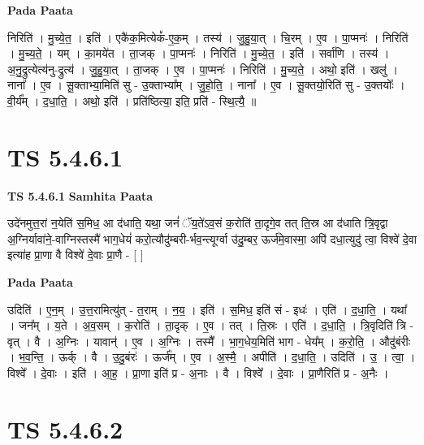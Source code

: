 \documentclass[17pt]{extarticle}
\begin{document}
\textbf{Pada Paata} \newline

निरिति॑ । मु॒च्ये॒त॒ । इति॑ । एकै॑क॒मित्येकं᳚-ए॒क॒म् । तस्य॑ । जु॒हु॒या॒त् । चि॒रम् । ए॒व । पा॒प्मनः॑ । निरिति॑ । मु॒च्य॒ते॒ । यम् । का॒मये॑त । ता॒जक् । पा॒प्मनः॑ । निरिति॑ । मु॒च्ये॒त॒ । इति॑ । सर्वा॑णि । तस्य॑ । अ॒नु॒द्रुत्येत्य॑नु-द्रुत्य॑ । जु॒हु॒या॒त् । ता॒जक् । ए॒व । पा॒प्मनः॑ । निरिति॑ । मु॒च्य॒ते॒ । अथो॒ इति॑ । खलु॑ । नाना᳚ । ए॒व । सू॒क्ताभ्या॒मिति॑ सु - उ॒क्ताभ्या᳚म् । जु॒हो॒ति॒ । नाना᳚ । ए॒व । सू॒क्तयो॒रिति॑ सु - उ॒क्तयोः᳚ । वी॒र्य᳚म् । द॒धा॒ति॒ । अथो॒ इति॑ । प्रति॑ष्ठित्या॒ इति॒ प्रति॑ - स्थि॒त्यै॒ ॥  \newline





\section{ TS 5.4.6.1 }

\textbf{TS 5.4.6.1 } \newline
\textbf{Samhita Paata} \newline

उदे॑नमुत्त॒रां न॒येति॑ स॒मिध॒ आ द॑धाति॒ यथा॒ जनं॑ ॅय॒ते॑ऽव॒सं क॒रोति॑ ता॒दृगे॒व तत् ति॒स्र आ द॑धाति त्रि॒वृद्वा अ॒ग्निर्यावा॑ने॒-वाग्निस्तस्मै॑ भाग॒धेयं॑ करो॒त्यौदु॑म्बरी-र्भव॒न्त्यूर्ग्वा उ॑दु॒म्बर॒ ऊर्ज॑मे॒वास्मा॒ अपि॑ दधा॒त्युदु॑ त्वा॒ विश्वे॑ दे॒वा इत्या॑ह प्रा॒णा वै विश्वे॑ दे॒वाः प्रा॒णै - [  ] \newline

\textbf{Pada Paata} \newline

उदिति॑ । ए॒न॒म् । उ॒त्त॒रामित्यु॑त् - त॒राम् । न॒य॒ । इति॑ । स॒मिध॒ इति॑ सं - इधः॑ । एति॑ । द॒धा॒ति॒ । यथा᳚ । जन᳚म् । य॒ते । अ॒व॒सम् । क॒रोति॑ । ता॒दृक् । ए॒व । तत् । ति॒स्रः । एति॑ । द॒धा॒ति॒ । त्रि॒वृदिति॑ त्रि - वृत् । वै । अ॒ग्निः । यावान्॑ । ए॒व । अ॒ग्निः । तस्मै᳚ । भा॒ग॒धेय॒मिति॑ भाग - धेय᳚म् । क॒रो॒ति॒ । औदु॑बंरीः । भ॒व॒न्ति॒ । ऊर्क् । वै । उ॒दु॒बंरः॑ । ऊर्ज᳚म् । ए॒व । अ॒स्मै॒ । अपीति॑ । द॒धा॒ति॒ । उदिति॑ । उ॒ । त्वा॒ । विश्वे᳚ । दे॒वाः । इति॑ । आ॒ह॒ । प्रा॒णा इति॑ प्र - अ॒नाः । वै । विश्वे᳚ । दे॒वाः । प्रा॒णैरिति॑ प्र - अ॒नैः ।  \newline





\section{ TS 5.4.6.2 }
\end{document}
